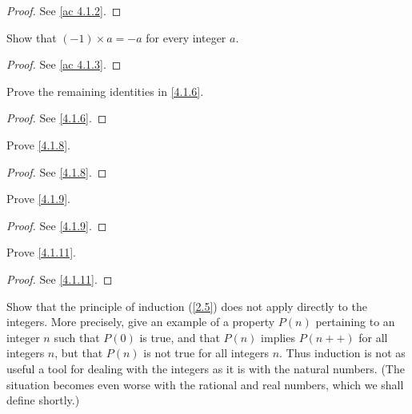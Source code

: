 \begin{proof}
  See \cref{ac 4.1.2}.
\end{proof}

\begin{exercise}\label{ex 4.1.3}
  Show that \((-1) \times a = -a\) for every integer \(a\).
\end{exercise}

\begin{proof}
  See \cref{ac 4.1.3}.
\end{proof}

\begin{exercise}\label{ex 4.1.4}
  Prove the remaining identities in \cref{4.1.6}.
\end{exercise}

\begin{proof}
  See \cref{4.1.6}.
\end{proof}

\begin{exercise}\label{ex 4.1.5}
  Prove \cref{4.1.8}.
\end{exercise}

\begin{proof}
  See \cref{4.1.8}.
\end{proof}

\begin{exercise}\label{ex 4.1.6}
  Prove \cref{4.1.9}.
\end{exercise}

\begin{proof}
  See \cref{4.1.9}.
\end{proof}

\begin{exercise}\label{ex 4.1.7}
  Prove \cref{4.1.11}.
\end{exercise}

\begin{proof}
  See \cref{4.1.11}.
\end{proof}

\begin{exercise}\label{ex 4.1.8}
  Show that the principle of induction (\cref{2.5}) does not apply directly to the integers.
  More precisely, give an example of a property \(P(n)\) pertaining to an integer \(n\) such that \(P(0)\) is true, and that \(P(n)\) implies \(P(n++)\) for all integers \(n\), but that \(P(n)\) is not true for all integers \(n\).
  Thus induction is not as useful a tool for dealing with the integers as it is with the natural numbers.
  (The situation becomes even worse with the rational and real numbers, which we shall define shortly.)
\end{exercise}

